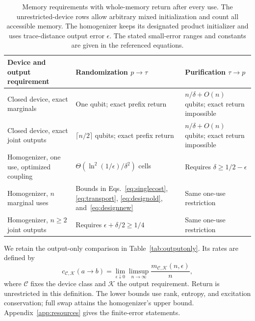 \documentclass[aps,pra,reprint,superscriptaddress,longbibliography,nofootinbib,floatfix]{revtex4-2}
\begin{document}
\begin{table}[t]
\caption{Memory requirements with whole-memory return after every use. The unrestricted-device rows allow arbitrary mixed initialization and count all accessible memory. The homogenizer keeps its designated product initializer and uses trace-distance output error $\epsilon$. The stated small-error ranges and constants are given in the referenced equations.}
\label{tab:return}
\begin{ruledtabular}
\begin{tabular}{p{}p{}p{}}
Device and output requirement & Randomization $p\to\tau$ & Purification $\tau\to p$\\
\hline
Closed device, exact marginals & One qubit; exact prefix return & $n/\delta+O(n)$ qubits; exact return impossible\\[4pt]
Closed device, exact joint outputs & $\lceil n/2\rceil$ qubits; exact prefix return & $n/\delta+O(n)$ qubits; exact return impossible\\[4pt]
Homogenizer, one use, optimized coupling & $\Theta(\ln^2(1/\epsilon)/\delta^2)$ cells & Requires $\delta\ge1/2-\epsilon$\\[4pt]
Homogenizer, $n$ marginal uses & Bounds in Eqs.~\eqref{eq:singlecost}, \eqref{eq:transport}, \eqref{eq:designold}, and~\eqref{eq:designnew} & Same one-use restriction\\[4pt]
Homogenizer, $n\ge2$ joint outputs & Requires $\epsilon+\delta/2\ge1/4$ & Same one-use restriction
\end{tabular}
\end{ruledtabular}
\end{table}

We retain the output-only comparison in Table~\ref{tab:outputonly}. Its rates are defined by
\begin{equation}
 c_{\mathcal C,\mathcal K}(a\to b)=
 \lim_{\epsilon\downarrow0}\limsup_{n\to\infty}
 \frac{m_{\mathcal C,\mathcal K}(n,\epsilon)}n,
 \label{eq:rate}
\end{equation}
where $\mathcal C$ fixes the device class and $\mathcal K$ the output requirement. Return is unrestricted in this definition. The lower bounds use rank, entropy, and excitation conservation; full swap attains the homogenizer's upper bound. Appendix~\ref{app:resources} gives the finite-error statements.
\end{document}
